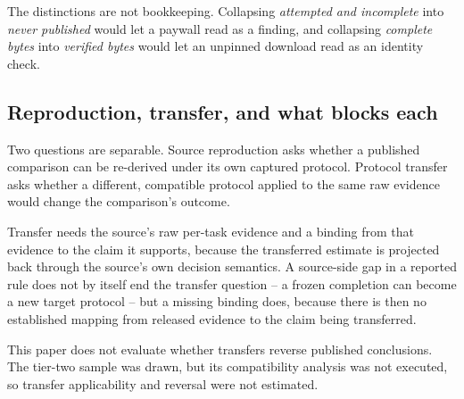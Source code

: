 The distinctions are not bookkeeping. Collapsing \emph{attempted and incomplete} into
\emph{never published} would let a paywall read as a finding, and collapsing \emph{complete
bytes} into \emph{verified bytes} would let an unpinned download read as an identity check.

\subsection{Reproduction, transfer, and what blocks each}

Two questions are separable. Source reproduction asks whether a published comparison can be
re-derived under its own captured protocol. Protocol transfer asks whether a different,
compatible protocol applied to the same raw evidence would change the comparison's outcome.

Transfer needs the source's raw per-task evidence and a binding from that evidence to the
claim it supports, because the transferred estimate is projected back through the source's
own decision semantics. A source-side gap in a reported rule does not by itself end the
transfer question -- a frozen completion can become a new target protocol -- but a missing
binding does, because there is then no established mapping from released evidence to the
claim being transferred.

This paper does not evaluate whether transfers reverse published conclusions. The tier-two
sample was drawn, but its compatibility analysis was not executed, so transfer applicability
and reversal were not estimated.
